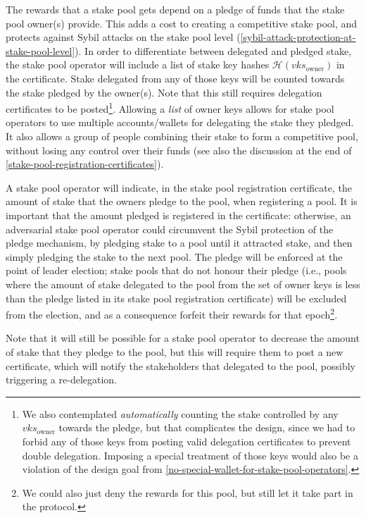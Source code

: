 \documentclass[11pt,a4paper]{article}
\begin{document}
The rewards that a stake pool gets depend on a pledge of funds that
the stake pool owner(s) provide. This adds a cost to creating a
competitive stake pool, and protects against Sybil attacks on the
stake pool level
(\cref{sybil-attack-protection-at-stake-pool-level}). In order to
differentiate between delegated and pledged stake, the stake pool
operator will include a list of stake key hashes
\(\mathcal{H}(vks_\text{owner})\)
in the certificate. Stake delegated from any of those keys will be
counted towards the stake pledged by the owner(s). Note that this
still requires delegation certificates to be posted\footnote{We also
  contemplated \emph{automatically} counting the stake controlled by
  any \(vks_\text{owner}\)
  towards the pledge, but that complicates the design, since we had
  to forbid any of those keys from posting valid delegation
  certificates to prevent double delegation. Imposing a special
  treatment of those keys would also be a violation of the design goal
  from \cref{no-special-wallet-for-stake-pool-operators}.}.
Allowing a \emph{list} of owner keys allows for stake pool operators
to use multiple accounts/wallets for delegating the stake they
pledged. It also allows a group of people combining their stake to
form a competitive pool, without losing any control over their funds
(see also the discussion at the end of
\cref{stake-pool-registration-certificates}).



A stake pool operator will indicate, in the stake pool registration
certificate,  the amount of stake that the owners pledge to
the pool, when registering a pool. It is important that the amount
pledged is registered in the certificate: otherwise,
an adversarial stake pool operator could circumvent the Sybil protection
of the pledge mechanism, by pledging stake to a pool until it attracted stake,
and then simply pledging the stake to the next pool. The pledge will be
enforced at the point of leader election; stake pools that do not
honour their pledge (i.e., pools where the amount of stake delegated
to the pool from the set of owner keys is less than the pledge listed
in its stake pool registration certificate) will be excluded from the election,
and as a consequence forfeit their rewards for that epoch\footnote{We
  could also just deny the rewards for this pool, but still let it take
  part in the protocol.}.

Note that it will still be possible for a stake pool operator to
decrease the amount of stake that they pledge to the pool, but this will
require them to post a new certificate, which will notify the
stakeholders that delegated to the pool, possibly triggering a
re-delegation.
\end{document}
